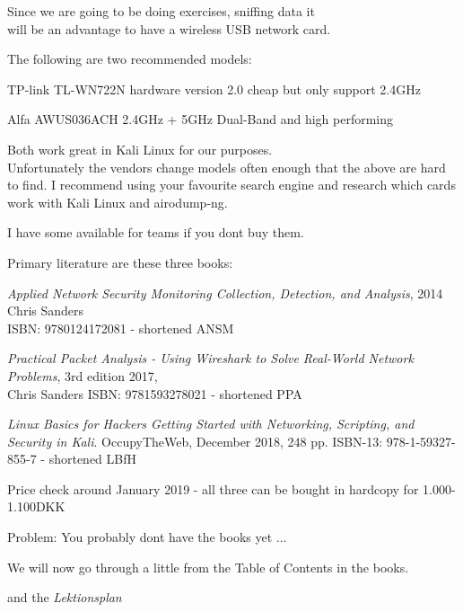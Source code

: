 \documentclass[Screen16to9,17pt]{foils}
\begin{document}
Since we are going to be doing exercises, sniffing data it \\
will be an advantage to have a wireless USB network card.
\begin{list2}
\item The following are two recommended models:
\item TP-link TL-WN722N hardware version 2.0 cheap but only support 2.4GHz
\item Alfa AWUS036ACH 2.4GHz + 5GHz Dual-Band and high performing
\item Both work great in Kali Linux for our purposes.\\
Unfortunately the vendors change models often enough that the above are hard to find. I recommend using your favourite search engine and research which cards work with Kali Linux and airodump-ng.
\end{list2}

I have some available for teams if you dont buy them.



Primary literature are these three books:
\begin{list2}
\item \emph{Applied Network Security Monitoring Collection, Detection, and Analysis}, 2014 Chris Sanders \\
ISBN: 9780124172081 - shortened ANSM
\item \emph{Practical Packet Analysis - Using Wireshark to Solve Real-World Network Problems}, 3rd edition 2017, \\
Chris Sanders ISBN: 9781593278021 - shortened PPA
\item \emph{Linux Basics for Hackers Getting Started with Networking, Scripting, and Security in Kali}. OccupyTheWeb, December 2018, 248 pp. ISBN-13: 978-1-59327-855-7 - shortened LBfH
\end{list2}

Price check around January 2019 - all three can be bought in hardcopy for 1.000-1.100DKK


\centerline{Problem: You probably dont have the books yet ...}


We will now go through a little from the Table of Contents in the books.

and the \emph{Lektionsplan}\\
\end{document}
